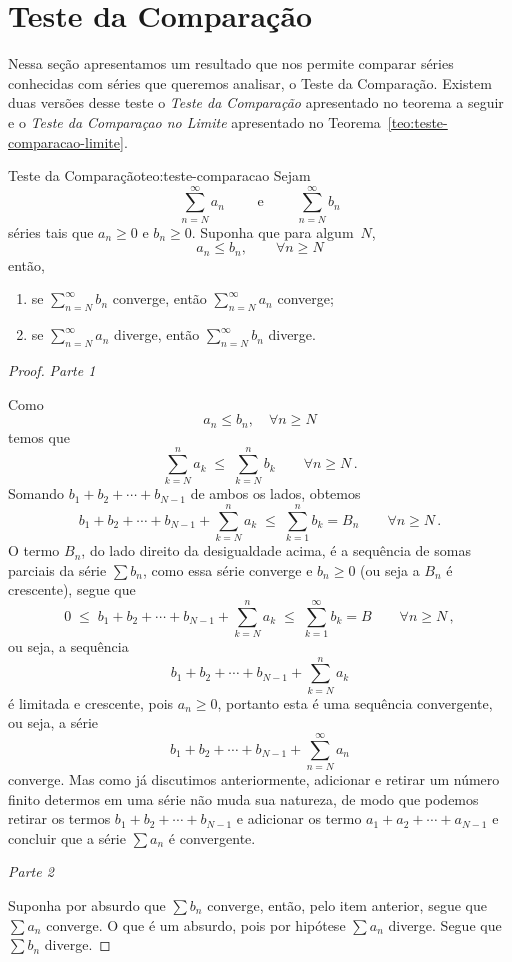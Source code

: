 \section{Teste da Comparação}

Nessa seção apresentamos um resultado que nos permite comparar séries conhecidas
com séries que queremos analisar, o Teste da Comparação. Existem duas versões
desse teste o \emph{Teste da Comparação} apresentado no teorema a seguir
e o \emph{Teste da Comparaçao no Limite} apresentado no Teorema~\ref{teo:teste-comparacao-limite}.

\begin{teorema}{Teste da Comparação}{teo:teste-comparacao}
  Sejam%
  \[
    \sum_{n=N}^\infty a_n
    \qquad\text{ e }\qquad
    \sum_{n=N}^\infty b_n
  \]
  séries tais que $a_n\geq 0$ e $b_n\geq 0$. Suponha que para algum~$N$,
  \[
    a_n\leq b_n, \qquad \forall  n\geq N
  \]
  então,
  \begin{enumerate}
    \item se \(\sum_{n=N}^\infty b_n\) converge, \tabto{45mm} então \(\sum_{n=N}^\infty a_n\) converge;
    \item se \(\sum_{n=N}^\infty a_n\) diverge,  \tabto{45mm} então \(\sum_{n=N}^\infty b_n\) diverge.
  \end{enumerate}
\end{teorema}
\begin{proof}
  \emph{Parte 1}

  Como
  \[
    a_n\leq b_n, \quad \forall  n\geq N
  \]
  temos que
  \[
    \sum_{k=N}^n a_k    \;\leq\;
    \sum_{k=N}^n b_k    \qquad \forall n\geq N      \,.
  \]
  Somando $b_1+b_2+\cdots+ b_{N-1}$ de ambos os lados, obtemos
  \[
    b_1 + b_2 + \cdots + b_{N-1} + \sum_{k=N}^na_k
    \;\leq\;
    \sum_{k=1}^nb_k=B_n \qquad \forall n\geq N         \,.
  \]
  O termo $B_n$, do lado direito da desigualdade acima, é a sequência de
  somas parciais da série $\sum b_n$, como essa série converge e
  $b_n\geq 0$ (ou seja a $B_n$ é crescente), segue que
  \[
    0 \;\leq\; b_1 + b_2 + \cdots + b_{N-1} + \sum_{k=N}^na_k
      \;\leq\; \sum_{k=1}^\infty b_k
      = B
      \qquad \forall n\geq N          \,,
  \]
  ou seja, a sequência
  \[
    b_1 + b_2 + \cdots + b_{N-1} + \sum_{k=N}^na_k
  \]
  é limitada e crescente,
  pois $a_n\geq 0$, portanto esta é uma sequência convergente, ou seja, a série
  \[
    b_1+b_2+\cdots+ b_{N-1}+\sum_{n=N}^\infty a_n
  \]
  converge. Mas como já discutimos
  anteriormente, adicionar e retirar um número finito determos em uma série não muda sua
  natureza, de modo que podemos retirar os termos $b_1+b_2+\cdots+ b_{N-1}$ e adicionar os
  termo $a_1+a_2+\cdots+ a_{N-1}$ e concluir que a série $\sum a_n$ é convergente.

\emph{Parte 2}

  Suponha por absurdo que $\sum b_n$ converge, então, pelo item anterior,
  segue que $\sum a_n$ converge. O que é um absurdo, pois por hipótese $\sum a_n$
  diverge. Segue que $\sum b_n$ diverge.
\end{proof}
